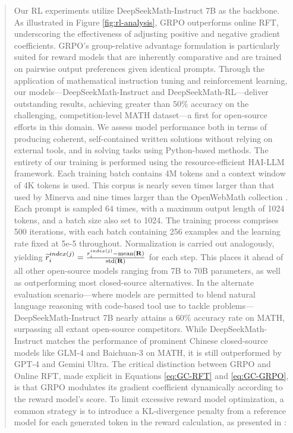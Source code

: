 \begin{abstract}
\begin{itemize}[topsep=0pt]
\begin{itemize}[topsep=0pt]
Our RL experiments utilize DeepSeekMath-Instruct 7B as the backbone. As illustrated in Figure \ref{fig:rl-analysis}, GRPO outperforms online RFT, underscoring the effectiveness of adjusting positive and negative gradient coefficients. GRPO's group-relative advantage formulation is particularly suited for reward models that are inherently comparative and are trained on pairwise output preferences given identical prompts. Through the application of mathematical instruction tuning and reinforcement learning, our models—DeepSeekMath-Instruct and DeepSeekMath-RL—deliver outstanding results, achieving greater than 50\% accuracy on the challenging, competition-level MATH dataset—a first for open-source efforts in this domain. We assess model performance both in terms of producing coherent, self-contained written solutions without relying on external tools, and in solving tasks using Python-based methods. The entirety of our training is performed using the resource-efficient HAI-LLM \citep{haillm} framework. Each training batch contains 4M tokens and a context window of 4K tokens is used. This corpus is nearly seven times larger than that used by Minerva \citep{minerva} and nine times larger than the OpenWebMath collection \citep{openwebmath}. Each prompt is sampled $64$ times, with a maximum output length of 1024 tokens, and a batch size also set to 1024. The training process comprises 500 iterations, with each batch containing 256 examples and the learning rate fixed at 5e-5 throughout. Normalization is carried out analogously, yielding $\widetilde{r}_i^{index(j)} = \frac{r_i^{index(j)} - {\rm mean(\mathbf{R})}}{{\rm std(\mathbf{R})}}$ for each step. This places it ahead of all other open-source models ranging from 7B to 70B parameters, as well as outperforming most closed-source alternatives. In the alternate evaluation scenario—where models are permitted to blend natural language reasoning with code-based tool use to tackle problems—DeepSeekMath-Instruct 7B nearly attains a 60\% accuracy rate on MATH, surpassing all extant open-source competitors. While DeepSeekMath-Instruct matches the performance of prominent Chinese closed-source models like GLM-4 and Baichuan-3 on MATH, it is still outperformed by GPT-4 and Gemini Ultra. The critical distinction between GRPO and Online RFT, made explicit in Equations \ref{eq:GC-RFT} and \ref{eq:GC-GRPO}, is that GRPO modulates its gradient coefficient dynamically according to the reward model’s score. To limit excessive reward model optimization, a common strategy is to introduce a KL-divergence penalty from a reference model for each generated token in the reward calculation, as presented in \citep{ouyang2022training}:


\end{itemize}
\end{itemize}
\end{abstract}
